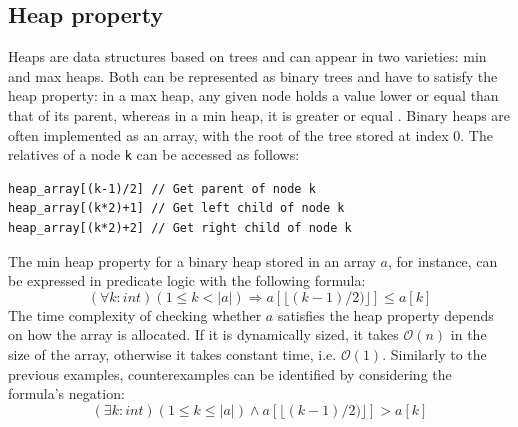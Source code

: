\subsection{Heap property}
Heaps \cite{dict_heap} are data structures based on trees and can appear in two varieties: min and max heaps. Both can be represented as binary trees and have to satisfy the heap property: in a max heap, any given node holds a value lower or equal than that of its parent, whereas in a min heap, it is greater or equal \cite{dict_heap_property}. Binary heaps are often implemented as an array, with the root of the tree stored at index 0. The relatives of a node \texttt{k} can be accessed as follows:
\begin{lstlisting}[language=Solidity, numbers=none, caption=Access a binary heap in array representation]
heap_array[(k-1)/2] // Get parent of node k
heap_array[(k*2)+1] // Get left child of node k
heap_array[(k*2)+2] // Get right child of node k
\end{lstlisting}
The min heap property for a binary heap stored in an array $a$, for instance, can be expressed in predicate logic with the following formula:
\begin{equation}\label{eq:heap-unversial}
  (\forall k : int) (1 \le k < |a|) \Rightarrow a[\lfloor(k-1)/2)\rfloor] \le a[k]
\end{equation}
The time complexity of checking whether $a$ satisfies the heap property depends on how the array is allocated. If it is dynamically sized, it takes $\mathcal{O}(n)$ in the size of the array, otherwise it takes constant time, i.e. $\mathcal{O}(1)$.  Similarly to the previous examples, counterexamples can be identified by considering the formula's negation:
\begin{equation}\label{eq:heap-unversial-neg}
  (\exists k : int) (1 \le k \le |a|) \land a[\lfloor(k-1)/2)\rfloor] > a[k]
\end{equation}

